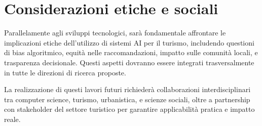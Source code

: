 \section{Considerazioni etiche e sociali}

Parallelamente agli sviluppi tecnologici, sarà fondamentale affrontare le implicazioni etiche dell'utilizzo di sistemi AI per il turismo, includendo questioni di bias algoritmico, equità nelle raccomandazioni, impatto sulle comunità locali, e trasparenza decisionale. Questi aspetti dovranno essere integrati trasversalmente in tutte le direzioni di ricerca proposte.

La realizzazione di questi lavori futuri richiederà collaborazioni interdisciplinari tra computer science, turismo, urbanistica, e scienze sociali, oltre a partnership con stakeholder del settore turistico per garantire applicabilità pratica e impatto reale.